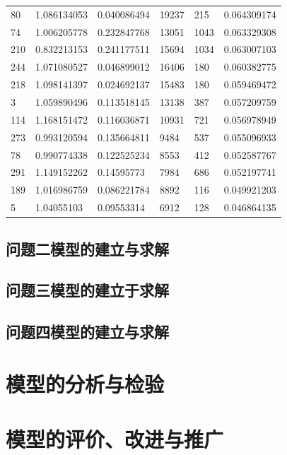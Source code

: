 \documentclass{cumcmthesis}
\begin{document}
\begin{description}
\begin{longtable}{l|llll|l}
80                          & 1.086134053 & 0.040086494 & 19237  & 215   & 0.064309174 \\
74                          & 1.006205778 & 0.232847768 & 13051  & 1043  & 0.063329308 \\
210                         & 0.832213153 & 0.241177511 & 15694  & 1034  & 0.063007103 \\
244                         & 1.071080527 & 0.046899012 & 16406  & 180   & 0.060382775 \\
218                         & 1.098141397 & 0.024692137 & 15483  & 180   & 0.059469472 \\
3                           & 1.059890496 & 0.113518145 & 13138  & 387   & 0.057209759 \\
114                         & 1.168151472 & 0.116036871 & 10931  & 721   & 0.056978949 \\
273                         & 0.993120594 & 0.135664811 & 9484   & 537   & 0.055096933 \\
78                          & 0.990774338 & 0.122525234 & 8553   & 412   & 0.052587767 \\
291                         & 1.149152262 & 0.14595773  & 7984   & 686   & 0.052197741 \\
189                         & 1.016986759 & 0.086221784 & 8892   & 116   & 0.049921203 \\
5                           & 1.04055103  & 0.09553314  & 6912   & 128   & 0.046864135\\
\bottomrule
\end{longtable}
\end{description}

\subsection{问题二模型的建立与求解}
\subsection{问题三模型的建立于求解}
\subsection{问题四模型的建立与求解}
\section{模型的分析与检验}
\section{模型的评价、改进与推广}




\begin{appendices}
\end{appendices}
\end{document}

